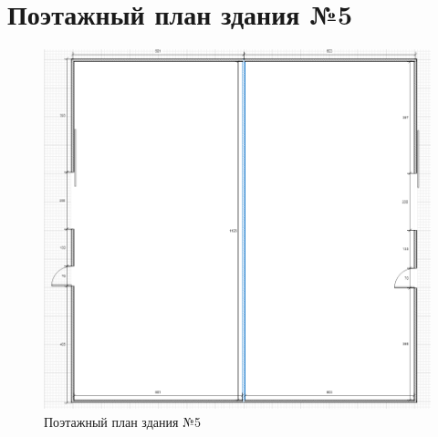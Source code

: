 \documentclass[a4paper,14pt,russian]{article}
\begin{document}
\section{Поэтажный план здания №5}
\begin{figure}
  \includegraphics[scale=0.58]{./5-building.png}
 \caption{Поэтажный план здания №5}
\end{figure}
\end{document}

